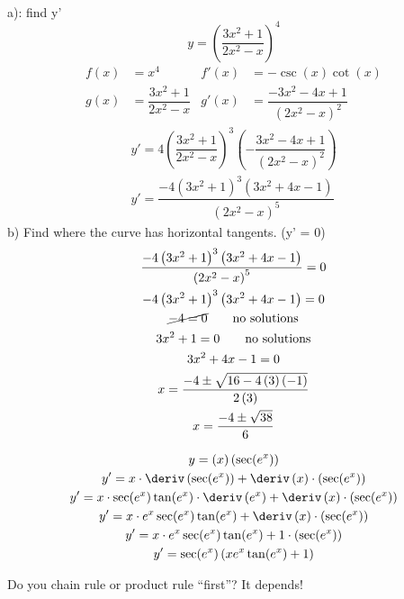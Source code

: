 \begin{example}\hspace{\textwidth}\\
    a): find y'
    \begin{equation*}
        y = \left(\dfrac{3x^2 + 1}{2x^2 - x}\right)^4
    \end{equation*}
    \begin{align*}
        f(x) &= x^4                        & f'(x) &= -\csc(x)\cot(x)\\
        g(x) &= \dfrac{3x^2 + 1}{2x^2 - x} & g'(x) &= \dfrac{-3x^2 - 4x + 1}{\left(2x^2 - x\right)^2}
    \end{align*}
    \begin{gather*}
        y' = 4\left(\dfrac{3x^2 + 1}{2x^2 - x}\right)^3\left(-\dfrac{3x^2 - 4x + 1}{\left(2x^2 - x\right)^2}\right) \\
        y' = \dfrac{-4 \left(3x^2 + 1\right)^3\left(3x^2 + 4x - 1\right)}{\left(2x^2 - x\right)^5}
    \end{gather*}
    b) Find where the curve has horizontal tangents. (y' = 0)
    \begin{gather*}
        \dfrac{-4 \left(3x^2 + 1\right)^3\left(3x^2 + 4x - 1\right)}{\left(2x^2 - x\right)^5} = 0 \\
        -4 \left(3x^2 + 1\right)^3\left(3x^2 + 4x - 1\right) = 0 \\
        \cancel{-4 = 0} \qquad \text{no solutions} \\
        3x^2 + 1 = 0 \qquad \text{no solutions} \\
        3x^2 + 4x - 1 = 0 \\
        x = \dfrac{-4 \pm \sqrt{16 -4\left(3\right)\left(-1\right)}}{2\left(3\right)} \\
        x = \dfrac{-4 \pm \sqrt{38}}{6}
    \end{gather*}
\end{example}
\begin{example}
    \begin{gather*}
        y = \left(x\right)\left(\sec(e^x)\right) \\
        y' = x \cdot \deriv \left(\sec(e^x)\right) + \deriv \left(x\right) \cdot \left(\sec(e^x)\right) \\
        y' = x \cdot \sec(e^x)\tan(e^x) \cdot \deriv\left(e^x\right) + \deriv \left(x\right) \cdot \left(\sec(e^x)\right) \\
        y' = x \cdot e^x \sec(e^x) \tan(e^x) + \deriv \left(x\right) \cdot \left(\sec(e^x)\right) \\
        y' = x \cdot e^x \sec(e^x) \tan(e^x) + 1 \cdot \left(\sec(e^x)\right) \\
        y' = \sec(e^x)\left(x e^x \tan(e^x) + 1\right)
    \end{gather*}
    \begin{note}
        Do you chain rule or product rule ``first''? It depends!
    \end{note}
\end{example}
